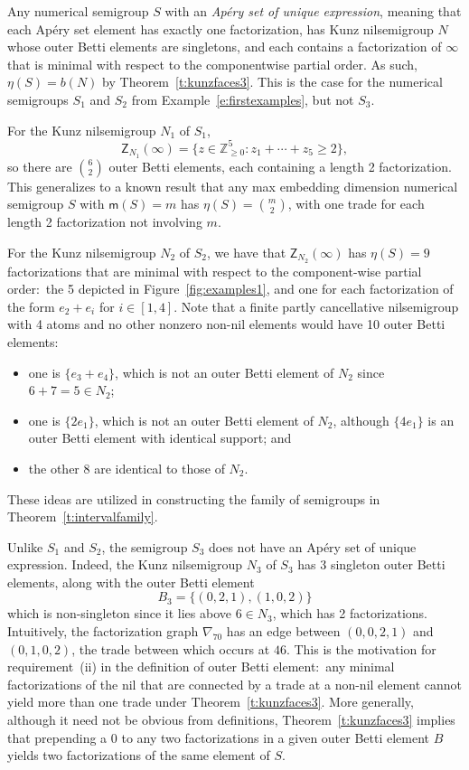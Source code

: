 \documentclass[ALCO]{cedram}
\newcommand\ZZ{\mathbb{Z}}
\begin{document}
\begin{exam}\label{e:outerbettis}
Any numerical semigroup $S$ with an \emph{Ap\'ery set of unique expression}, meaning that each Ap\'ery set element has exactly one factorization, has Kunz nilsemigroup $N$ whose outer Betti elements are singletons, and each contains a factorization of $\infty$ that is minimal with respect to the componentwise partial order. As such, $\eta(S) = b(N)$ by Theorem~\ref{t:kunzfaces3}.  
This is the case for the numerical semigroups $S_1$ and $S_2$ from Example~\ref{e:firstexamples}, but not $S_3$.  

For the Kunz nilsemigroup $N_1$ of $S_1$, 
$$\mathsf Z_{N_1}(\infty) = \{z \in \ZZ_{\ge 0}^5 : z_1 + \cdots + z_5 \ge 2\},$$
so there are $\binom{6}{2}$ outer Betti elements, each containing a length 2 factorization.  
This generalizes to a known result that any max embedding dimension numerical semigroup $S$ with $\mathsf m(S) = m$ has $\eta(S) = \binom{m}{2}$, with one trade for each length 2 factorization not involving $m$.  

For the Kunz nilsemigroup $N_2$ of $S_2$, we have that $\mathsf Z_{N_2}(\infty)$ has $\eta(S) = 9$ factorizations that are minimal with respect to the component-wise partial order:\ the 5 depicted in Figure~\ref{fig:examples1}, and one for each factorization of the form $e_2 + e_i$ for $i \in [1,4]$.  Note that a finite partly cancellative nilsemigroup with 4 atoms and no other nonzero non-nil elements would have 10 outer Betti elements:\ 
\begin{itemize}
\item
one is $\{e_3 + e_4\}$, which is not an outer Betti element of $N_2$ since $6 + 7 = 5 \in N_2$;

\item
one is $\{2e_1\}$, which is not an outer Betti element of $N_2$, although $\{4e_1\}$ is an outer Betti element with identical support; and

\item
the other 8 are identical to those of $N_2$.  

\end{itemize}
These ideas are utilized in constructing the family of semigroups in Theorem~\ref{t:intervalfamily}.  

Unlike $S_1$ and $S_2$, the semigroup $S_3$ does not have an Ap\'ery set of unique expression.  Indeed, the Kunz nilsemigroup $N_3$ of $S_3$ has 3 singleton outer Betti elements, along with the outer Betti element 
$$B_3 = \{(0,2,1), (1,0,2)\}$$
which is non-singleton since it lies above $6 \in N_3$, which has 2 factorizations.  Intuitively, the factorization graph $\nabla_{70}$ has an edge between $(0,0,2,1)$ and $(0,1,0,2)$, the trade between which occurs at $46$.  This is the motivation for requirement~(ii) in the definition of outer Betti element:\ any minimal factorizations of the nil that are connected by a trade at a non-nil element cannot yield more than one trade under Theorem~\ref{t:kunzfaces3}.  
More generally, although it need not be obvious from definitions, Theorem~\ref{t:kunzfaces3} implies that prepending a 0 to any two factorizations in a given outer Betti element $B$ yields two factorizations of the same element of $S$.  
\end{exam}
\end{document}
